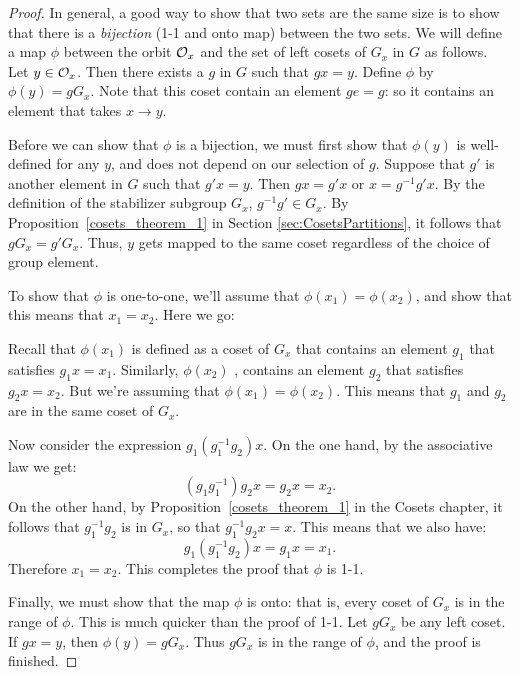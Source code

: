 \begin{proof}
In general, a good way to show that two sets are the same size is to show that there is a \emph{bijection} (1-1 and onto map) between the two sets.  
 We will define a map $\phi$
between the orbit ${\cal O}_x$ and the set of left cosets of $G_x$ in $G$ as follows. Let $y \in {\cal O}_x$. Then there 
exists a $g$ in $G$ such that $g x = y$. Define $\phi$ by $\phi( y ) 
= g G_x$. Note that this coset contain an element $ge=g$:  so it contains an element that takes $x\rightarrow y$.  

Before we can show that $\phi$ is a bijection, we must first show that $\phi(y)$ is well-defined for any $y$, and does 
not depend on our selection of $g$. Suppose that $g'$ is another 
element in $G$ such that $g'x = y$. Then $g x = g' x$ or $x= g^{-1} g' x$. 
By the definition of the stabilizer subgroup $G_x$, $g^{-1}g'\in G_x$. By Proposition~\ref{cosets_theorem_1} in Section \ref{sec:CosetsPartitions}, it follows that 
 $g G_x = g' G_x$. Thus, $y$ gets mapped to the same 
coset regardless of the choice of group element.


To show that $\phi$ is one-to-one, we'll assume that $\phi(x_1) =
\phi(x_2)$, and show that this means that $x_1=x_2$. Here we go: 

Recall that $\phi(x_1)$ is defined as a coset of $G_x$ that contains an element $g_1$ that satisfies $g_1x=x_1.$   Similarly,  $\phi(x_2)$ , contains  an element $g_2$ that satisfies $g_2x=x_2$. But we're assuming that $\phi(x_1) =
\phi(x_2)$.  This means that $g_1$ and $g_2$ are in the same coset of $G_x$.  

Now consider the expression $g_1(g_1^{-1}g_2)x$. On the one hand, by the associative law we get:
$$(g_1g_1^{-1})g_2x=g_2x=x_2.$$ 
 On the other hand, by Proposition~\ref{cosets_theorem_1} in the Cosets chapter, it follows that $g_1^{-1}g_2$ is in $G_x$, so that $g_1^{-1}g_2x=x$.  This means that we also have:
$$g_1(g_1^{-1}g_2)x=g_1x=x_1.$$
  Therefore $x_1=x_2$.  This completes the proof that $\phi$ is 1-1.

Finally, we must show
that the map $\phi$ is onto: that is, every coset of $G_x$ is in the range of $\phi$. This is much quicker than the proof of 1-1. 
Let $g G_x$ be any  left coset. If $g x =y$, then $\phi(y) = g G_x$.  Thus $gG_x$ is in the range of $\phi$, and the proof is finished.
\end{proof}

